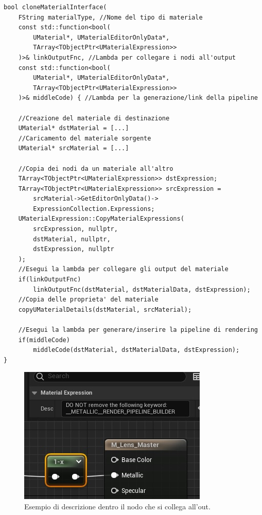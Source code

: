 \documentclass[main.tex]{subfiles}
\begin{document}
\begin{lstlisting}
bool cloneMaterialInterface(
    FString materialType, //Nome del tipo di materiale
    const std::function<bool(
        UMaterial*, UMaterialEditorOnlyData*,
        TArray<TObjectPtr<UMaterialExpression>>
    )>& linkOutputFnc, //Lambda per collegare i nodi all'output
    const std::function<bool(
        UMaterial*, UMaterialEditorOnlyData*,
        TArray<TObjectPtr<UMaterialExpression>>
    )>& middleCode) { //Lambda per la generazione/link della pipeline

    //Creazione del materiale di destinazione
    UMaterial* dstMaterial = [...]
    //Caricamento del materiale sorgente
    UMaterial* srcMaterial = [...]

    //Copia dei nodi da un materiale all'altro
	TArray<TObjectPtr<UMaterialExpression>> dstExpression;
	TArray<TObjectPtr<UMaterialExpression>> srcExpression =
        srcMaterial->GetEditorOnlyData()->
        ExpressionCollection.Expressions;
	UMaterialExpression::CopyMaterialExpressions(
        srcExpression, nullptr,
        dstMaterial, nullptr,
        dstExpression, nullptr
    );
	//Esegui la lambda per collegare gli output del materiale
	if(linkOutputFnc)
        linkOutputFnc(dstMaterial, dstMaterialData, dstExpression);
	//Copia delle proprieta' del materiale
	copyUMaterialDetails(dstMaterial, srcMaterial);

	//Esegui la lambda per generare/inserire la pipeline di rendering
	if(middleCode)
        middleCode(dstMaterial, dstMaterialData, dstExpression);
}
\end{lstlisting}
\par
\begin{figure}
    \centering
    \captionsetup{justification=centering}
    \includegraphics[scale=0.65]{img/renderingPipeline/descLink.jpg}
    \caption{Esempio di descrizione dentro il nodo che si collega all'out.}
    \label{fig:2_searchDesc}
\end{figure}
\end{document}
